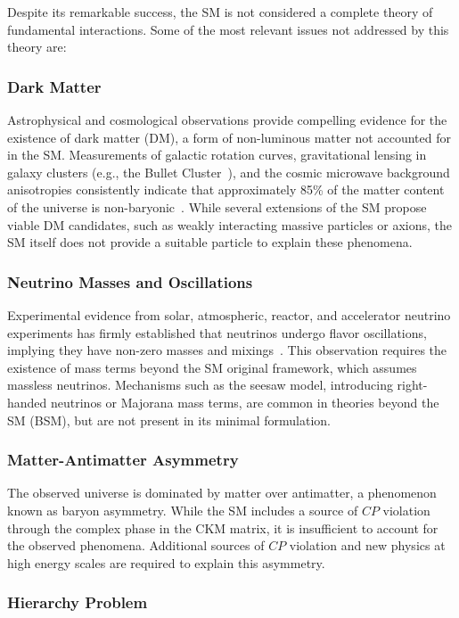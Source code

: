 Despite its remarkable success, the SM is not considered a complete theory of fundamental interactions. Some of the most relevant issues not addressed by this theory are:
\subsubsection*{Dark Matter}

Astrophysical and cosmological observations provide compelling evidence for the existence of dark matter (DM), a form of non-luminous matter not accounted for in the SM. Measurements of galactic rotation curves, gravitational lensing in galaxy clusters (e.g., the Bullet Cluster~\cite{Clowe_2006}), and the cosmic microwave background anisotropies consistently indicate that approximately 85\% of the matter content of the universe is non-baryonic~\cite{Planck}. While several extensions of the SM propose viable DM candidates, such as weakly interacting massive particles or axions, the SM itself does not provide a suitable particle to explain these phenomena.

\subsubsection*{Neutrino Masses and Oscillations}

Experimental evidence from solar, atmospheric, reactor, and accelerator neutrino experiments has firmly established that neutrinos undergo flavor oscillations, implying they have non-zero masses and mixings~\cite{PhysRevD.98.030001}. This observation requires the existence of mass terms beyond the SM original framework, which assumes massless neutrinos. Mechanisms such as the seesaw model, introducing right-handed neutrinos or Majorana mass terms, are common in theories beyond the SM (BSM), but are not present in its minimal formulation.

\subsubsection*{Matter-Antimatter Asymmetry}

The observed universe is dominated by matter over antimatter, a phenomenon known as baryon asymmetry. While the SM includes a source of $CP$ violation through the complex phase in the CKM matrix, it is insufficient to account for the observed phenomena. Additional sources of $CP$ violation and new physics at high energy scales are required to explain this asymmetry.

\subsubsection*{Hierarchy Problem}

